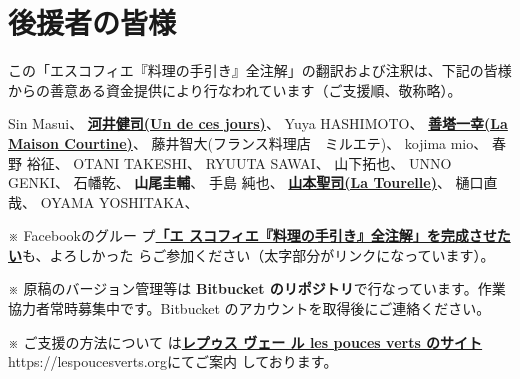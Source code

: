 \hypertarget{benefactors}{%
\section{後援者の皆様}\label{benefactors}}

\thispagestyle{empty}

\small

この「エスコフィエ『料理の手引き』全注解」の翻訳および注釈は、下記の皆様からの善意ある資金提供により行なわれています（ご支援順、敬称略）。

\normalsize
\vspace{1\zw}

Sin Masui、\href{20180524-23h,2x,novelsoundsmail@gmail.com}{}
\href{http://www.undecesjours.com/}{\textbf{河井健司(Un de ces
jours)}}、\href{20180525-0h14,10x,20180605-11h42,10x,kwibeng@gmail.com}{}
Yuya HASHIMOTO、\href{20180525-1h40,2x,hashimo0910@gmail.com}{}
\href{http://www.courtine.jp/}{\textbf{善塔一幸(La Maison
Courtine)}}、\href{20180525-8h56,10x,kazuyukizento120@docomo.ne.jp}{}
藤井智大(フランス料理店　ミルエテ)、\href{20180525-10h07,1x,apple19761019@yahoo.co.jp}{}
kojima mio、\href{20180525-12h23,1x,teeeeshow@yahoo.co.jp}{} 春野
裕征、\href{20180528-2h41,20180617,2x,amanojack.v-o-v@i.softbank.jp}{}
OTANI TAKESHI、\href{20180529-17h26,2x,1000feuille@ezweb.ne.jp}{} RYUUTA
SAWAI、\href{20180530-2h57.1x,rs.ajtk.zz@i.softbank.jp}{}
山下拓也、\href{20180605-11h04,5x,FB:Takuya\%20Yamashita}{} UNNO
GENKI、\href{20180605-22h12,1x,guriiva@aol.com}{}
石幡乾、\href{201806060-6h24,1x,zonek.gentile.bonheur.ken05@gmail.com}{}
\textbf{山尾圭輔}、\href{20180612-10h27,20x,yamaokeisuke@hotmail.com}{}
手島 純也、\href{20180612-19h19,1x,junchef1975@yahoo.co.jp}{}
\href{http://www.tourelle.jp/}{\textbf{山本聖司(La
Tourelle)}}、\href{20180622,10x,tourelle@tourelle.jp}{}
樋口直哉、\href{20180622-10h58,1x}{} OYAMA
YOSHITAKA、\href{20180622-22h50,x2}{}

\vfill

\small

※ Facebookのグルー
プ\href{https://www.facebook.com/groups/1548833425201180/}{\textbf{「エ
    スコフィエ『料理の手引き』全注解」を完成させたい}}も、よろしかった
らご参加ください（太字部分がリンクになっています）。

※ 原稿のバージョン管理等は \textbf{Bitbucket
のリポジトリ}で行なっています。作業協力者常時募集中です。Bitbucket
のアカウントを取得後にご連絡ください。

※ ご支援の方法について
は\href{https://lespoucesverts.org/archives/7042}{\textbf{レプゥス ヴェー
    ル les pouces verts のサイト}} https://lespoucesverts.orgにてご案内
しております。

\normalsize
